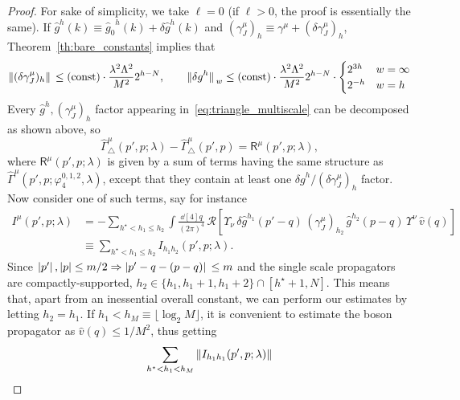 \documentclass[a4paper, 11pt]{article}
\newcommand{\cutoff}{\Lambda}								%
\newcommand{\sing}[2]{{#1}^{#2}}							%
\renewcommand{\phi}{\varphi}								%
\newcommand{\ren}{\mathcal{R}}								%
\newcommand{\floor}[1]{\lfloor #1 \rfloor}					%
\theoremstyle{thm}
\begin{document}
\begin{proof}
For sake of simplicity, we take $\ell = 0$ (if $\ell > 0$, the proof is essentially the same). If $\sing{\hat{g}}{h}(k) \equiv \sing{\hat{g}_0}{h}(k) + \sing{\delta \hat{g}}{h}(k)$ and $(\gamma^\mu_J)_h \equiv \gamma^\mu + (\delta \gamma^\mu_J)_h$, Theorem~\ref{th:bare_constants} implies that
\begin{equation}
\label{eq:estiamtes_remainders}
\norm*{(\delta \gamma^\mu_J)_h} \le (\mathrm{const}) \cdot \frac{\lambda^2 \cutoff^2}{M^2} 2^{h - N}, \qquad
\norm*{\sing{\delta g}{h}}_w \le (\mathrm{const}) \cdot \frac{\lambda^2 \cutoff^2}{M^2} 2^{h - N} \cdot
\begin{cases}
2^{3h}	&	w = \infty \\
2^{-h}	&	w = h
\end{cases}
\end{equation}
Every $\sing{\hat{g}}{h}, (\gamma^\mu_J)_h$ factor appearing in~\eqref{eq:triangle_multiscale} can be decomposed as shown above, so
\begin{equation}
\hat{\Gamma}^\mu_\triangle(p', p; \lambda) - \hat{\Gamma}^\mu_\triangle(p', p)  = \mathsf{R}^\mu(p', p; \lambda),
\end{equation}
where $\mathsf{R}^\mu(p', p; \lambda)$ is given by a sum of terms having the same structure as $\hat{\Gamma}^\mu(p', p; \phi_4^{0, 1, 2}, \lambda)$, except that they contain at least one $\sing{\delta g}{h}/(\delta \gamma^\mu_J)_h$ factor. Now consider one of such terms, say for instance
\begin{align*}
I^\mu(p', p; \lambda) 
& = - \sum_{h^\star < h_1 \le h_2} \int \frac{\dd[4]{q}}{(2\pi)^4} \, \ren[\Upsilon_\nu \, \sing{\delta \hat{g}}{h_1}(p' - q) \, (\gamma^\mu_J)_{h_2} \, \sing{\hat{g}}{h_2}(p - q) \, \Upsilon^\nu \, \hat{v}(q)] \\
& \equiv \sum_{h^\star < h_1 \le h_2} I_{h_1 h_2}(p', p; \lambda).
\end{align*}
Since $\abs*{p'}, \abs{p} \le m/2 \Rightarrow \abs*{p' - q - (p - q)} \le m$ and the single scale propagators are compactly-supported, $h_2 \in \lbrace h_1, h_1 + 1, h_1 + 2 \rbrace \cap [h^\star+1, N]$. This means that, apart from an inessential overall constant, we can perform our estimates by letting $h_2 = h_1$. If $h_1 < h_M \equiv \floor{\log_2 M}$, it is convenient to estimate the boson propagator as $\hat{v}(q) \le 1/M^2$, thus getting
\begin{align}
\label{eq:delta_low_regime}
\begin{split}
\sum_{h^\star < h_1 < h_M} \norm{I_{h_1 h_1}(p', p; \lambda)}

\end{split}
\end{align}
\end{proof}
\end{document}

